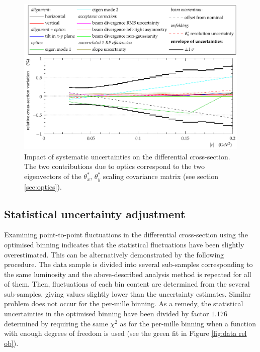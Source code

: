 \begin{figure}
\begin{center}
\includegraphics[width=15cm]{fig/direct_method_mode_cmp_presentation.pdf}
\caption{%
Impact of systematic uncertainties on the differential cross-section. The two contributions due to optics correspond to the two eigenvectors of the $\theta_x^*$, $\theta_y^*$ scaling covariance matrix (see section \ref{sec:optics}).
}
\label{fig:syst unc}
\end{center}
\end{figure}


\subsection{Statistical uncertainty adjustment}
\label{sec:stat unc adj}

Examining point-to-point fluctuations in the differential cross-section using the optimised binning indicates that the statistical fluctuations have been slightly overestimated. This can be alternatively demonstrated by the following procedure. The data sample is divided into several sub-samples corresponding to the same luminosity and the above-described analysis method is repeated for all of them. Then, fluctuations of each bin content are determined from the several sub-samples, giving values slightly lower than the uncertainty estimates. Similar problem does not occur for the per-mille binning.
As a remedy, the statistical uncertainties in the optimised binning have been divided by factor $1.176$ determined by requiring the same $\chi^2$ as for the per-mille binning when a function with enough degrees of freedom is used (see the green fit in Figure \ref{fig:data rel ob}).


